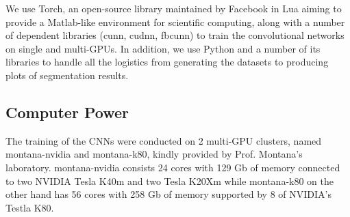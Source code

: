 We use Torch, an open-source library maintained by Facebook in Lua aiming to provide a Matlab-like environment for scientific computing, along with a number of dependent libraries (cunn, cudnn, fbcunn) to train the convolutional networks on single and multi-GPUs. In addition, we use Python and a number of its libraries to handle all the logistics from generating the datasets to producing plots of segmentation results.

\subsection{Computer Power}

The training of the CNNs were conducted on 2 multi-GPU clusters, named montana-nvidia and montana-k80, kindly provided by Prof. Montana's laboratory. montana-nvidia consists 24 cores with 129 Gb of memory connected to two NVIDIA Tesla K40m and two Tesla K20Xm while montana-k80 on the other hand has 56 cores with 258 Gb of memory supported by 8 of NVIDIA's Testla K80. 














